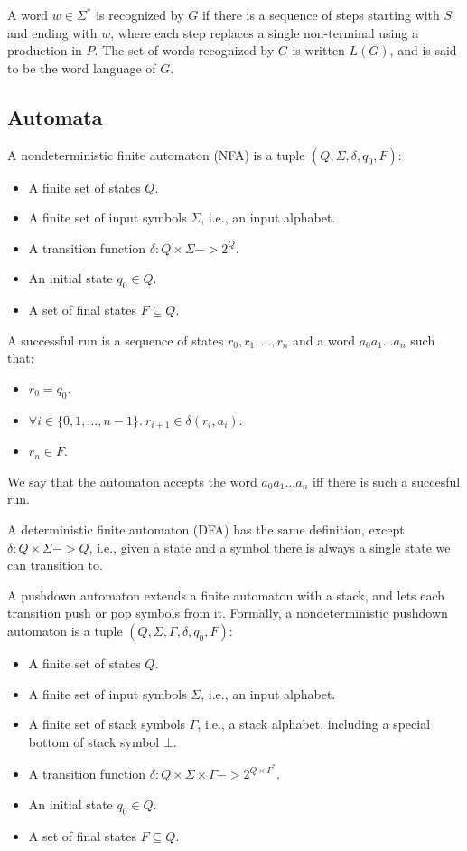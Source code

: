 \documentclass[acmsmall,review,anonymous]{acmart}\settopmatter{printfolios=true,printccs=false,printacmref=false}
\newcommand{\T}{\Sigma} %
\begin{document}
\noindent A word $w \in \T^{*}$ is recognized by $G$ if there is a sequence of steps starting with $S$ and ending with $w$, where each step replaces a single non-terminal using a production in $P$. The set of words recognized by $G$ is written $L(G)$, and is said to be the word language of $G$.

\subsection{Automata} \label{sec:preliminaries-automata}

A nondeterministic finite automaton (NFA) is a tuple $(Q, \Sigma, \delta, q_0, F)$:

\begin{itemize}
\item A finite set of states $Q$.
\item A finite set of input symbols $\Sigma$, i.e., an input alphabet.
\item A transition function $\delta: Q \times \Sigma -> 2^Q$.
\item An initial state $q_0 \in Q$.
\item A set of final states $F \subseteq Q$.
\end{itemize}

\noindent A successful run is a sequence of states $r_0, r_1, \ldots, r_n$ and a word $a_0a_1\ldots a_n$ such that:

\begin{itemize}
\item $r_0 = q_0$.
\item $\forall i \in \{0, 1, \ldots, n-1\}.\ r_{i+1} \in \delta(r_i, a_i)$.
\item $r_n \in F$.
\end{itemize}

\noindent We say that the automaton accepts the word $a_0a_1\ldots a_n$ iff there is such a succesful run.

A deterministic finite automaton (DFA) has the same definition, except $\delta : Q \times \Sigma -> Q$, i.e., given a state and a symbol there is always a single state we can transition to.

A pushdown automaton extends a finite automaton with a stack, and lets each transition push or pop symbols from it. Formally, a nondeterministic pushdown automaton is a tuple $(Q, \Sigma, \Gamma, \delta, q_0, F)$:

\begin{itemize}
\item A finite set of states $Q$.
\item A finite set of input symbols $\Sigma$, i.e., an input alphabet.
\item A finite set of stack symbols $\Gamma$, i.e., a stack alphabet, including a special bottom of stack symbol $\bot$.
\item A transition function $\delta: Q \times \Sigma \times \Gamma -> 2^{Q \times \Gamma^{*}}$.
\item An initial state $q_0 \in Q$.
\item A set of final states $F \subseteq Q$.
\end{itemize}
\end{document}
